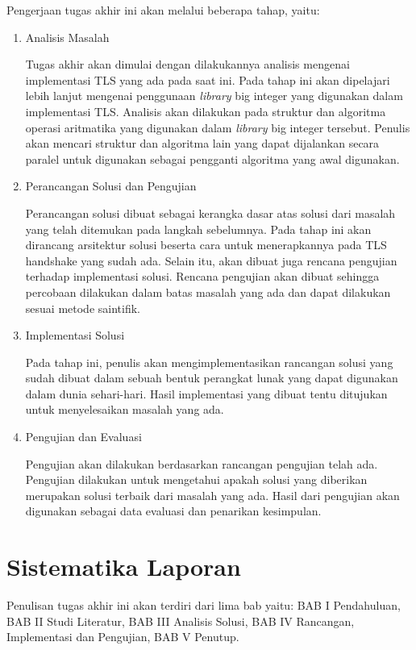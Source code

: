 Pengerjaan tugas akhir ini akan melalui beberapa tahap, yaitu:
\begin{enumerate}
  \item Analisis Masalah

  Tugas akhir akan dimulai dengan dilakukannya analisis mengenai implementasi TLS yang ada pada saat ini. Pada tahap ini akan dipelajari lebih lanjut mengenai penggunaan \textit{library} big integer yang digunakan dalam implementasi TLS. Analisis akan dilakukan pada struktur dan algoritma operasi aritmatika yang digunakan dalam \textit{library} big integer tersebut. Penulis akan mencari struktur dan algoritma lain yang dapat dijalankan secara paralel untuk digunakan sebagai pengganti algoritma yang awal digunakan.

  \item Perancangan Solusi dan Pengujian

  Perancangan solusi dibuat sebagai kerangka dasar atas solusi dari masalah yang telah ditemukan pada langkah sebelumnya. Pada tahap ini akan dirancang arsitektur solusi beserta cara untuk menerapkannya pada TLS handshake yang sudah ada. Selain itu, akan dibuat juga rencana pengujian terhadap implementasi solusi. Rencana pengujian akan dibuat sehingga percobaan dilakukan dalam batas masalah yang ada dan dapat dilakukan sesuai metode saintifik.

  \item Implementasi Solusi

  Pada tahap ini, penulis akan mengimplementasikan rancangan solusi yang sudah dibuat dalam sebuah bentuk perangkat lunak yang dapat digunakan dalam dunia sehari-hari. Hasil implementasi yang dibuat tentu ditujukan untuk menyelesaikan masalah yang ada.

  \item Pengujian dan Evaluasi

  Pengujian akan dilakukan berdasarkan rancangan pengujian telah ada. Pengujian dilakukan untuk mengetahui apakah solusi yang diberikan merupakan solusi terbaik dari masalah yang ada. Hasil dari pengujian akan digunakan sebagai data evaluasi dan penarikan kesimpulan.

\end{enumerate}


\section{Sistematika Laporan}
  Penulisan tugas akhir ini akan terdiri dari lima bab yaitu: BAB I Pendahuluan, BAB II Studi Literatur, BAB III Analisis Solusi, BAB IV Rancangan, Implementasi dan Pengujian, BAB V Penutup.

